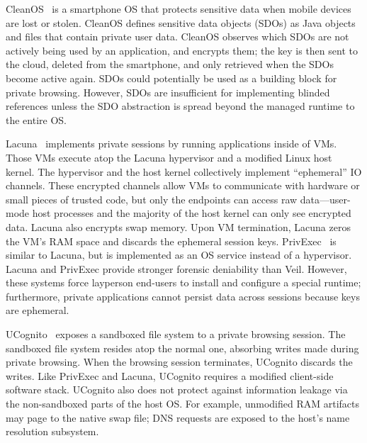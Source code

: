 CleanOS~\cite{cleanOS} is a smartphone OS that
protects sensitive data when mobile devices
are lost or stolen. CleanOS defines sensitive
data objects (SDOs) as Java objects
and files that contain private user data.
CleanOS observes which SDOs are not actively
being used by an application, and encrypts
them; the key is then sent to the cloud, deleted
from the smartphone, and only retrieved when
the SDOs become active again. SDOs could
potentially be used as a building block for
private browsing. However, SDOs are insufficient
for implementing blinded references unless
the SDO abstraction is spread beyond the managed
runtime to the entire OS.

Lacuna~\cite{lacuna} implements private sessions
by running applications inside of VMs. Those VMs
execute atop the Lacuna hypervisor and a modified
Linux host kernel. The hypervisor and the host
kernel collectively implement ``ephemeral'' IO
channels. These encrypted channels allow VMs to
communicate with hardware or small pieces of
trusted code, but only the endpoints can access
raw data---user-mode host processes and the majority
of the host kernel can only see encrypted data.
Lacuna also encrypts swap memory. Upon VM
termination, Lacuna zeros the VM's RAM space and
discards the ephemeral session keys.
PrivExec~\cite{privExec} is similar to Lacuna,
but is implemented as an OS service instead of
a hypervisor.
%
%
Lacuna and PrivExec provide stronger forensic
deniability than Veil. However, these systems
force layperson end-users to install and configure
a special runtime; furthermore, private applications
cannot persist data across sessions because keys are
ephemeral.

UCognito~\cite{ucognito} exposes a sandboxed file system
to a private browsing session. The sandboxed file system
resides atop the normal one, absorbing writes made during
private browsing. When the browsing session terminates,
UCognito discards the writes. Like PrivExec and Lacuna,
UCognito requires a modified client-side software stack.
UCognito also does not protect against information leakage
via the non-sandboxed parts of the host OS. For example,
unmodified RAM artifacts may page to the native swap file;
DNS requests are exposed to the host's name resolution
subsystem.

